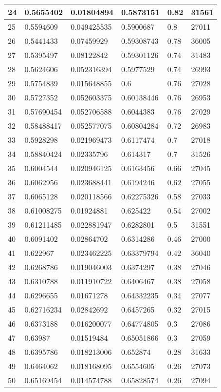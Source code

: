 \begin{longtable}{|l|l|l|l|l|l|}
24 & 0.5655402 & 0.01804894 & 0.5873151 & 0.82 & 31561 \\ \hline 
25 & 0.5594609 & 0.049425535 & 0.5900687 & 0.8 & 27011 \\ \hline 
26 & 0.5441433 & 0.07459929 & 0.59308743 & 0.78 & 36005 \\ \hline 
27 & 0.5395497 & 0.08122842 & 0.59301126 & 0.74 & 31483 \\ \hline 
28 & 0.5624606 & 0.052316394 & 0.5977529 & 0.74 & 26993 \\ \hline 
29 & 0.5754839 & 0.015648855 & 0.6 & 0.76 & 27028 \\ \hline 
30 & 0.5727352 & 0.052603375 & 0.60138446 & 0.76 & 26953 \\ \hline 
31 & 0.57690454 & 0.052706588 & 0.6044383 & 0.76 & 27029 \\ \hline 
32 & 0.58488417 & 0.052577075 & 0.60804284 & 0.72 & 26983 \\ \hline 
33 & 0.5928298 & 0.021969473 & 0.6117474 & 0.7 & 27018 \\ \hline 
34 & 0.58840424 & 0.02335796 & 0.614317 & 0.7 & 31526 \\ \hline 
35 & 0.6004544 & 0.020946125 & 0.6163456 & 0.66 & 27045 \\ \hline 
36 & 0.6062956 & 0.023688441 & 0.6194246 & 0.62 & 27055 \\ \hline 
37 & 0.6065128 & 0.020118566 & 0.62275326 & 0.58 & 27033 \\ \hline 
38 & 0.61008275 & 0.01924881 & 0.625422 & 0.54 & 27002 \\ \hline 
39 & 0.61211485 & 0.022881947 & 0.6282801 & 0.5 & 31551 \\ \hline 
40 & 0.6091402 & 0.02864702 & 0.6314286 & 0.46 & 27000 \\ \hline 
41 & 0.622967 & 0.023462225 & 0.63379794 & 0.42 & 36040 \\ \hline 
42 & 0.6268786 & 0.019046003 & 0.6374297 & 0.38 & 27046 \\ \hline 
43 & 0.6310788 & 0.011910722 & 0.6406467 & 0.38 & 27058 \\ \hline 
44 & 0.6296655 & 0.01671278 & 0.64332235 & 0.34 & 27077 \\ \hline 
45 & 0.62716234 & 0.02842692 & 0.6457265 & 0.32 & 27015 \\ \hline 
46 & 0.6373188 & 0.016200077 & 0.64774805 & 0.3 & 27086 \\ \hline 
47 & 0.63987 & 0.01519484 & 0.65051866 & 0.3 & 27059 \\ \hline 
48 & 0.6395786 & 0.018213006 & 0.652874 & 0.28 & 31633 \\ \hline 
49 & 0.6464062 & 0.018168095 & 0.6554605 & 0.26 & 27073 \\ \hline 
50 & 0.65169454 & 0.014574788 & 0.65828574 & 0.26 & 27094 \\ \hline 
\end{longtable}